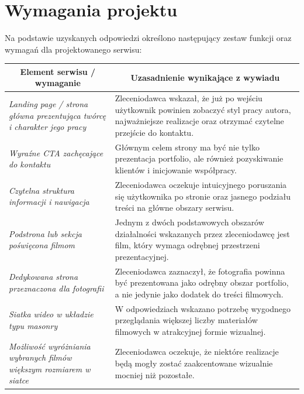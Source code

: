 \chapter{Wymagania projektu}

Na podstawie uzyskanych odpowiedzi określono następujący zestaw funkcji oraz wymagań dla projektowanego serwisu:

\bgroup
\def\arraystretch{1.2}
\begin{longtable}{| p{} | p{} |} 
\hline
\multicolumn{1}{|c|}{\textbf{Element serwisu / wymaganie}} & \multicolumn{1}{|c|}{\textbf{Uzasadnienie wynikające z wywiadu}} \\ \hline\hline
\textit{Landing page / strona główna prezentująca twórcę i charakter jego pracy        } & Zleceniodawca wskazał, że już po wejściu użytkownik powinien zobaczyć styl pracy autora, najważniejsze realizacje oraz otrzymać czytelne przejście do kontaktu. \\ \hline
\textit{Wyraźne CTA zachęcające do kontaktu                                            } & Głównym celem strony ma być nie tylko prezentacja portfolio, ale również pozyskiwanie klientów i inicjowanie współpracy.                                        \\ \hline
\textit{Czytelna struktura informacji i nawigacja                                      } & Zleceniodawca oczekuje intuicyjnego poruszania się użytkownika po stronie oraz jasnego podziału treści na główne obszary serwisu.                               \\ \hline
\textit{Podstrona lub sekcja poświęcona filmom                                         } & Jednym z dwóch podstawowych obszarów działalności wskazanych przez zleceniodawcę jest film, który wymaga odrębnej przestrzeni prezentacyjnej.                   \\ \hline
\textit{Dedykowana strona przeznaczona dla fotografii                                  } & Zleceniodawca zaznaczył, że fotografia powinna być prezentowana jako odrębny obszar portfolio, a nie jedynie jako dodatek do treści filmowych.                  \\ \hline
\textit{Siatka wideo w układzie typu masonry                                           } & W odpowiedziach wskazano potrzebę wygodnego przeglądania większej liczby materiałów filmowych w atrakcyjnej formie wizualnej.                                   \\ \hline
\textit{Możliwość wyróżniania wybranych filmów większym rozmiarem w siatce             } & Zleceniodawca oczekuje, że niektóre realizacje będą mogły zostać zaakcentowane wizualnie mocniej niż pozostałe.                                                 \\ \hline

\end{longtable}
